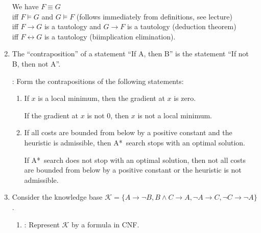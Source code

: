\documentclass[solution]{acAssignment}
\begin{document}
\begin{enumerate}
        \begin{acSolution}
            We have $F \equiv G$\\
            iff $F \models G$ and $G \models F$ (follows immediately from definitions, see lecture)\\
            iff $F \to G$ is a tautology and $G \to F$ is a tautology (deduction theorem)\\
            iff $F \leftrightarrow G$ is a tautology (biimplication elimination).
        \end{acSolution}
        
    \item The \enquote{contraposition} of a statement \enquote{If A, then B} is the statement \enquote{If not B, then not A}.
    
        : Form the contrapositions of the following statements:
        
        \begin{enumerate}
            \item If $x$ is a local minimum, then the gradient at $x$ is zero.
            
                \begin{acSolution}
                    If the gradient at $x$ is not $0$, then $x$ is not a local minimum.
                \end{acSolution}
            
            \item If all costs are bounded from below by a positive constant and the heuristic is admissible, then A*~search stops with an optimal solution.
            
                \begin{acSolution}
                    If A*~search does not stop with an optimal solution, then not all costs are bounded from below by a positive constant or the heuristic is not admissible.
                \end{acSolution}
        \end{enumerate}
        
    \acIfSolution{\clearpage}{}
    \item Consider the knowledge base $\mathcal{K} = \{A \to \lnot B, B \land C \to A, \lnot A \to C, \lnot C \to \lnot A\}$.
    
        \begin{enumerate}
            \item {}: Represent $\mathcal{K}$ by a formula in CNF.
            

\end{enumerate}
\end{enumerate}
\end{document}
